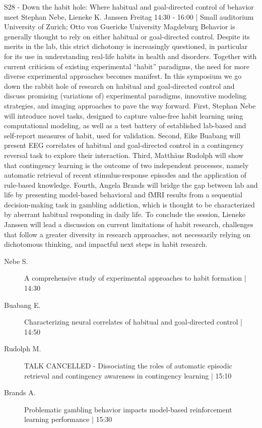 
            \begin{symposium}
            {S28 - Down the habit hole: Where habitual and goal-directed control of behavior meet}
            {Stephan Nebe, Lieneke K. Janssen}
            {Freitag 14:30 - 16:00 | Small auditorium}
            {University of Zurich; Otto von Guericke University Magdeburg}
            Behavior is generally thought to rely on either habitual or goal-directed control. Despite its merits in the lab, this strict dichotomy is increasingly questioned, in particular for its use in understanding real-life habits in health and disorders. Together with current criticism of existing experimental “habit” paradigms, the need for more diverse experimental approaches becomes manifest. In this symposium we go down the rabbit hole of research on habitual and goal-directed control and discuss promising (variations of) experimental paradigms, innovative modeling strategies, and imaging approaches to pave the way forward. First, Stephan Nebe will introduce novel tasks, designed to capture value-free habit learning using computational modeling, as well as a test battery of established lab-based and self-report measures of habit, used for validation. Second, Eike Buabang will present EEG correlates of habitual and goal-directed control in a contingency reversal task to explore their interaction. Third, Matthäus Rudolph will show that contingency learning is the outcome of two independent processes, namely automatic retrieval of recent stimulus-response episodes and the application of rule-based knowledge. Fourth, Angela Brands will bridge the gap between lab and life by presenting model-based behavioral and fMRI results from a sequential decision-making task in gambling addiction, which is thought to be characterized by aberrant habitual responding in daily life. To conclude the session, Lieneke Janssen will lead a discussion on current limitations of habit research, challenges that follow a greater diversity in research approaches, not necessarily relying on dichotomous thinking, and impactful next steps in habit research.
            \begin{description}    
            
                \item [ Nebe S.] A comprehensive study of experimental approaches to habit formation \textcolor{mygray}{ | 14:30}    
                
                \item [ Buabang E.] Characterizing neural correlates of habitual and goal-directed control \textcolor{mygray}{ | 14:50}    
                
                \item [ Rudolph M.] TALK CANCELLED - Dissociating the roles of automatic episodic retrieval and contingency awareness in contingency learning \textcolor{mygray}{ | 15:10}    
                
                \item [ Brands A.] Problematic gambling behavior impacts model-based reinforcement learning performance \textcolor{mygray}{ | 15:30}    
                
            \end{description} 
            \end{symposium}
            